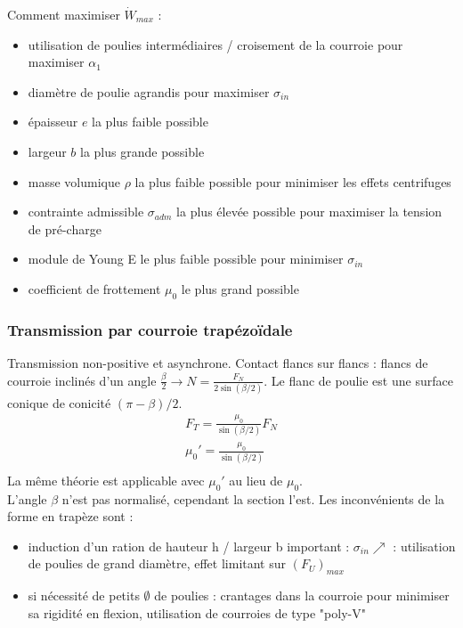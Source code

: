 \documentclass[../main.tex]{subfiles}
\begin{document}
Comment maximiser $\dot{W}_{max}$ : \begin{itemize}
    \item utilisation de poulies intermédiaires / croisement de la courroie pour maximiser $\alpha_1$\\
    \item diamètre de poulie agrandis pour maximiser $\sigma_{in}$\\
    \item épaisseur $e$ la plus faible possible\\
    \item largeur $b$ la plus grande possible\\
    \item masse volumique $\rho$ la plus faible possible pour minimiser les effets centrifuges\\
    \item contrainte admissible $\sigma_{adm}$ la plus élevée possible pour maximiser la tension de pré-charge\\
    \item module de Young E le plus faible possible pour minimiser $\sigma_{in}$\\
    \item coefficient de frottement $\mu_0$ le plus grand possible\\
\end{itemize}

\subsubsection{Transmission par courroie trapézoïdale}
Transmission non-positive et asynchrone. Contact flancs sur flancs : flancs de courroie inclinés d'un angle $\frac{\beta}{2} \rightarrow N = \frac{F_N}{2 \sin(\beta/2)}$. Le flanc de poulie est une surface conique de conicité $(\pi-\beta)/2$. \\

\begin{equation}
\begin{gathered}
    F_T = \frac{\mu_0}{\sin(\beta/2)}F_N\\
    \mu_0' = \frac{\mu_0}{\sin(\beta/2)}\\
\end{gathered}
\end{equation}
La même théorie est applicable avec $\mu_0'$ au lieu de $\mu_0$.\\

L'angle $\beta$ n'est pas normalisé, cependant la section l'est. Les inconvénients de la forme en trapèze sont : \begin{itemize}
    \item induction d'un ration de hauteur h / largeur b important : $\sigma_{in} \nearrow$ : utilisation de poulies de grand diamètre, effet limitant sur $(F_U)_{max}$\\
    \item si nécessité de petits $\emptyset$ de poulies : crantages dans la courroie pour minimiser sa rigidité en flexion, utilisation de courroies de type "poly-V"\\
\end{itemize}
\end{document}
